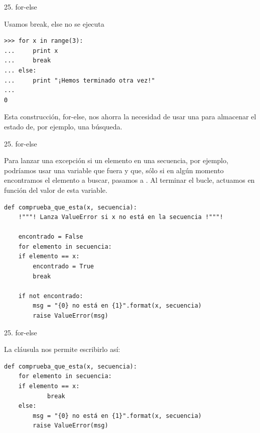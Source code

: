 \documentclass[14pt]{beamer}
\begin{document}
\begin{frame}[fragile]{25. for-else}
  \small
  \begin{exampleblock}
    {Usamos break, else no se ejecuta}
    \begin{lstlisting}
>>> for x in range(3):
...     print x
...     break
... else:
...     print "¡Hemos terminado otra vez!"
...
0
    \end{lstlisting}
  \end{exampleblock}

  \begin{alertblock}{}
    \centering
    Esta construcción, for-else, nos ahorra la necesidad de usar una
     para almacenar el estado de, por
    ejemplo, una búsqueda.
  \end{alertblock}
\end{frame}

\begin{frame}[fragile]{25. for-else}
  \footnotesize
  \begin{block}{}
    \centering
    Para lanzar una excepción si un elemento  en una secuencia, por ejemplo, podríamos usar una
    variable que fuera  y que, sólo si en algún
    momento encontramos el elemento a buscar, pasamos a
    . Al terminar el bucle, actuamos en función del
    valor de esta variable.
  \end{block}

  \begin{exampleblock}{}
    \scriptsize
    \begin{lstlisting}[escapechar=!]
def comprueba_que_esta(x, secuencia):
    !"""! Lanza ValueError si x no está en la secuencia !"""!

    encontrado = False
    for elemento in secuencia:
    if elemento == x:
        encontrado = True
        break

    if not encontrado:
        msg = "{0} no está en {1}".format(x, secuencia)
        raise ValueError(msg)
    \end{lstlisting}
  \end{exampleblock}
\end{frame}

\begin{frame}[fragile]{25. for-else}
  \begin{block}{}
    \centering
    La cláusula  nos permite escribirlo así:
  \end{block}

  \begin{exampleblock}{}
    \scriptsize
    \begin{lstlisting}
def comprueba_que_esta(x, secuencia):
    for elemento in secuencia:
    if elemento == x:
            break
    else:
        msg = "{0} no está en {1}".format(x, secuencia)
        raise ValueError(msg)
    \end{lstlisting}
  \end{exampleblock}
\end{frame}
\end{document}
